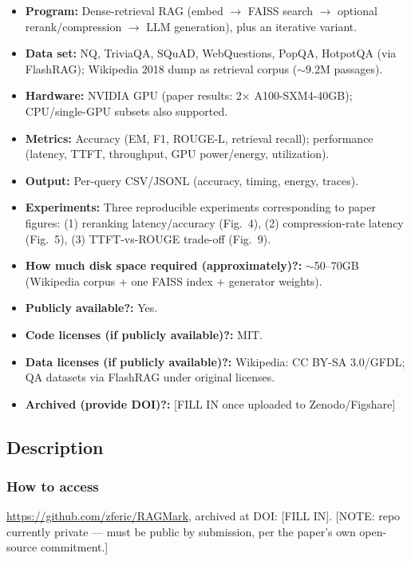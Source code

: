 {\small
\begin{itemize}
  \item {\bf Program: } Dense-retrieval RAG (embed $\to$ FAISS search $\to$ optional rerank/compression $\to$ LLM generation), plus an iterative variant.
  \item {\bf Data set: } NQ, TriviaQA, SQuAD, WebQuestions, PopQA, HotpotQA (via FlashRAG); Wikipedia 2018 dump as retrieval corpus ($\sim$9.2M passages).
  \item {\bf Hardware: } NVIDIA GPU (paper results: 2$\times$ A100-SXM4-40GB); CPU/single-GPU subsets also supported.
  \item {\bf Metrics: } Accuracy (EM, F1, ROUGE-L, retrieval recall); performance (latency, TTFT, throughput, GPU power/energy, utilization).
  \item {\bf Output: } Per-query CSV/JSONL (accuracy, timing, energy, traces).
  \item {\bf Experiments: } Three reproducible experiments corresponding to paper figures: (1) reranking latency/accuracy (Fig.~4), (2) compression-rate latency (Fig.~5), (3) TTFT-vs-ROUGE trade-off (Fig.~9).
  \item {\bf How much disk space required (approximately)?: } $\sim$50--70GB (Wikipedia corpus + one FAISS index + generator weights).
  \item {\bf Publicly available?: } Yes.
  \item {\bf Code licenses (if publicly available)?: } MIT.
  \item {\bf Data licenses (if publicly available)?: } Wikipedia: CC BY-SA 3.0/GFDL; QA datasets via FlashRAG under original licenses.
  \item {\bf Archived (provide DOI)?: } [FILL IN once uploaded to Zenodo/Figshare]
\end{itemize}
}


\subsection{Description}

\subsubsection{How to access}
\url{https://github.com/zferic/RAGMark}, archived at DOI: [FILL IN].
[NOTE: repo currently private — must be public by submission, per the paper's own open-source commitment.]

